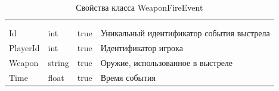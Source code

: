 \begin{xltabular}{\textwidth}{|X|X|X|X|}
	\caption{Свойства класса WeaponFireEvent}\label{table:WeaponFireEvent}\\ \hline
	 &  &  &  \\ \hline
	 &  &  &  \\ \hline
	\endfirsthead
	 \hline
	 &  &  &  \\ \hline
	\endhead
	Id & int & true & Уникальный идентификатор события выстрела \\ \hline
	PlayerId & int & true & Идентификатор игрока \\ \hline
	Weapon & string & true & Оружие, использованное в выстреле \\ \hline
	Time & float & true & Время события \\ \hline
\end{xltabular}

